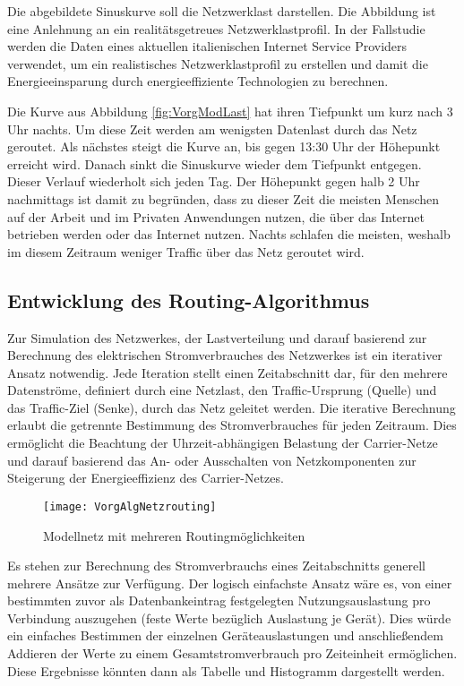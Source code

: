 Die abgebildete Sinuskurve soll die Netzwerklast darstellen. Die Abbildung ist eine Anlehnung an ein realitätsgetreues Netzwerklastprofil. In der Fallstudie \cite[1]{Chiaraviglio2009} werden die Daten eines aktuellen italienischen Internet Service Providers verwendet, um ein realistisches Netzwerklastprofil zu erstellen und damit die Energieeinsparung durch energieeffiziente Technologien zu berechnen.

Die Kurve aus Abbildung \ref{fig:VorgModLast} hat ihren Tiefpunkt um kurz nach 3 Uhr nachts. Um diese Zeit werden am wenigsten Datenlast durch das Netz geroutet. Als nächstes steigt die Kurve an, bis gegen 13:30 Uhr der Höhepunkt erreicht wird. Danach sinkt die Sinuskurve wieder dem Tiefpunkt entgegen. Dieser Verlauf wiederholt sich jeden Tag. Der Höhepunkt gegen halb 2 Uhr nachmittags ist damit zu begründen, dass zu dieser Zeit die meisten Menschen auf der Arbeit und im Privaten Anwendungen nutzen, die über das Internet betrieben werden oder das Internet   nutzen. Nachts schlafen die meisten, weshalb im diesem Zeitraum weniger Traffic über das Netz geroutet wird. 

\subsection{Entwicklung des Routing-Algorithmus}\label{subsec:VorgAlg}
Zur Simulation des Netzwerkes, der Lastverteilung und darauf basierend zur Berechnung des elektrischen Stromverbrauches des Netzwerkes ist ein iterativer Ansatz notwendig. Jede Iteration stellt einen Zeitabschnitt dar, für den mehrere Datenströme, definiert durch eine Netzlast, den Traffic-Ursprung (Quelle) und das Traffic-Ziel (Senke), durch das Netz geleitet werden. Die iterative Berechnung erlaubt die getrennte Bestimmung des Stromverbrauches für jeden Zeitraum. Dies ermöglicht die Beachtung der Uhrzeit-abhängigen Belastung der Carrier-Netze und darauf basierend das An- oder Ausschalten von Netzkomponenten zur Steigerung der Energieeffizienz des Carrier-Netzes.  

\begin{figure}[!ht]
	\centering
	\texttt{[image: VorgAlgNetzrouting]}
	\caption{Modellnetz mit mehreren Routingmöglichkeiten}
	\label{fig:VorgAlgNetzrouting}
\end{figure}

Es stehen zur Berechnung des Stromverbrauchs eines Zeitabschnitts generell mehrere Ansätze zur Verfügung. Der logisch einfachste Ansatz wäre es, von einer bestimmten zuvor als Datenbankeintrag festgelegten Nutzungsauslastung pro Verbindung auszugehen (feste Werte bezüglich Auslastung je Gerät). Dies würde ein einfaches Bestimmen der einzelnen Geräte\-aus\-las\-tungen und anschließendem Addieren der Werte zu einem Gesamtstromverbrauch pro Zeiteinheit ermöglichen. Diese Ergebnisse könnten dann als Tabelle und Histogramm dargestellt werden.

